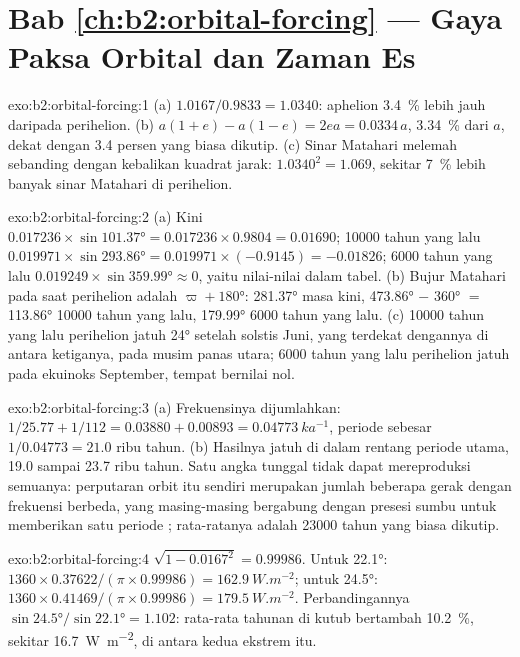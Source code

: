 \section*{Bab \ref{ch:b2:orbital-forcing} --- Gaya Paksa Orbital dan Zaman Es}

\begin{solution}{exo:b2:orbital-forcing:1}
(a) $1.0167/0.9833 = 1.0340$: aphelion \qty{3.4}{\percent} lebih jauh daripada perihelion.
(b) $a(1 + e) - a(1 - e) = 2ea = 0.0334\,a$, \qty{3.34}{\percent} dari $a$, dekat dengan 3.4 persen
yang biasa dikutip. (c) Sinar Matahari melemah sebanding dengan kebalikan kuadrat jarak: $1.0340^2 = 1.069$,
sekitar \qty{7}{\percent} lebih banyak sinar Matahari di perihelion.
\end{solution}

\begin{solution}{exo:b2:orbital-forcing:2}
(a) Kini $0.017236 \times \sin\ang{101.37} = 0.017236 \times 0.9804 = 0.01690$; \num{10000} tahun yang lalu
$0.019971 \times \sin\ang{293.86} = 0.019971 \times (-0.9145) = -0.01826$; \num{6000} tahun yang lalu
$0.019249 \times \sin\ang{359.99} \approx 0$, yaitu nilai-nilai dalam tabel. (b) Bujur Matahari pada saat
perihelion adalah $\varpi + \ang{180}$: \ang{281.37} masa kini, \ang{473.86} $-$ \ang{360} $=$ \ang{113.86}
\num{10000} tahun yang lalu, \ang{179.99} \num{6000} tahun yang lalu. (c) \num{10000} tahun yang lalu perihelion
jatuh \ang{24} setelah solstis Juni, yang terdekat dengannya di antara ketiganya, pada musim panas utara;
\num{6000} tahun yang lalu perihelion jatuh pada ekuinoks September, tempat  bernilai nol.
\end{solution}

\begin{solution}{exo:b2:orbital-forcing:3}
(a) Frekuensinya dijumlahkan: $1/25.77 + 1/112 = 0.03880 + 0.00893 = \qty{0.04773}{ka^{-1}}$, periode
sebesar $1/0.04773 = 21.0$ ribu tahun. (b) Hasilnya jatuh di dalam rentang periode utama,
19.0 sampai 23.7 ribu tahun. Satu angka tunggal tidak dapat mereproduksi semuanya: perputaran orbit
itu sendiri merupakan jumlah beberapa gerak dengan frekuensi berbeda, yang masing-masing bergabung dengan
presesi sumbu untuk memberikan satu periode ; rata-ratanya adalah
\num{23000} tahun yang biasa dikutip.
\end{solution}

\begin{solution}{exo:b2:orbital-forcing:4}
$\sqrt{1 - 0.0167^2} = 0.99986$. Untuk \ang{22.1}: $1360 \times 0.37622/(\pi \times 0.99986) =
\qty{162.9}{W.m^{-2}}$; untuk \ang{24.5}: $1360 \times 0.41469/(\pi \times 0.99986) =
\qty{179.5}{W.m^{-2}}$. Perbandingannya $\sin\ang{24.5}/\sin\ang{22.1} = 1.102$: rata-rata tahunan di
kutub bertambah \qty{10.2}{\percent}, sekitar \qty{16.7}{W.m^{-2}}, di antara kedua ekstrem itu.
\end{solution}

